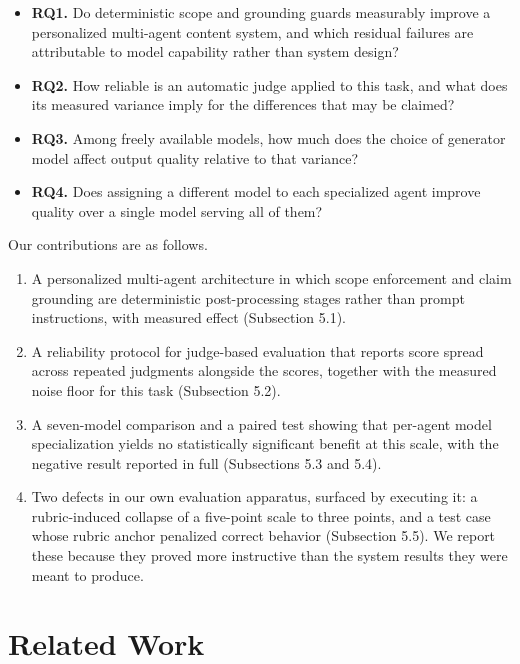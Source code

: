 \documentclass[9pt,twocolumn]{extarticle}
\begin{document}
\begin{itemize}
\item \textbf{RQ1.} Do deterministic scope and grounding guards measurably
      improve a personalized multi-agent content system, and which residual
      failures are attributable to model capability rather than system design?
\item \textbf{RQ2.} How reliable is an automatic judge applied to this task,
      and what does its measured variance imply for the differences that may
      be claimed?
\item \textbf{RQ3.} Among freely available models, how much does the choice of
      generator model affect output quality relative to that variance?
\item \textbf{RQ4.} Does assigning a different model to each specialized agent
      improve quality over a single model serving all of them?
\end{itemize}

Our contributions are as follows.

\begin{enumerate}
\item A personalized multi-agent architecture in which scope enforcement and
      claim grounding are deterministic post-processing stages rather than
      prompt instructions, with measured effect (Subsection 5.1).
\item A reliability protocol for judge-based evaluation that reports score
      spread across repeated judgments alongside the scores, together with
      the measured noise floor for this task (Subsection 5.2).
\item A seven-model comparison and a paired test showing that per-agent model
      specialization yields no statistically significant benefit at this
      scale, with the negative result reported in full (Subsections 5.3
      and 5.4).
\item Two defects in our own evaluation apparatus, surfaced by executing it: a
      rubric-induced collapse of a five-point scale to three points, and a
      test case whose rubric anchor penalized correct behavior
      (Subsection 5.5). We report these because they proved more instructive
      than the system results they were meant to produce.
\end{enumerate}

\section{Related Work}
\end{document}
